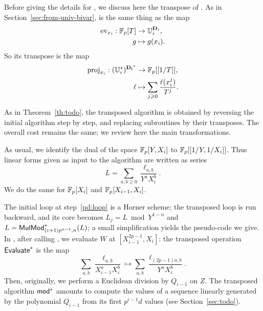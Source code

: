 Before giving the details for , we discuss here the
transpose of .  As in
Section~\ref{sec:from-univ-bivar},  is the same thing
as the map
\begin{equation}
  \label{eq:81}
  \begin{aligned}
    \operatorname{ev}_{x_i}:\mathbb{F}_p[T] &\rightarrow \mathbb{U}_i^{\mathbf{D}_i}\text{,}\\ 
    g&\mapsto g(x_i)\text{.}
  \end{aligned}
\end{equation}
So its transpose is the map
\begin{equation}
  \label{eq:82}
  \begin{aligned}
    \operatorname{proj}_{x_i}:(\mathbb{U}_i^\ast)^{\mathbf{D_i}^\ast}&\rightarrow\mathbb{F}_p[[1/T]]\text{,}\\
    \ell&\mapsto\sum_{j\geqslant0}\frac{\ell(x_i^j)}{T^j}\text{.}
  \end{aligned}
\end{equation}

As in Theorem~\ref{th:todo}, the transposed algorithm is obtained by
reversing the initial algorithm step by step, and replacing
subroutines by their transposes. The overall cost remains the same; we
review here the main transformations.

As usual, we identify the dual of the space $\mathbb{F}_p[Y,X_i]$ to
$\mathbb{F}_p[[1/Y,1/X_i]]$. Thus linear forms given as input to the algorithm
are written as series
\begin{equation}
  \label{eq:84}
  L=\sum_{a,b\ge0}\frac{\ell_{a,b}}{Y^aX_i^b}
  \text{.}
\end{equation}
We do the same for $\mathbb{F}_p[X_i]$ and $\mathbb{F}_p[X_{i-1},X_i]$.

The initial loop at step~\ref{pd:loop} is a Horner scheme; the
transposed loop is run backward, and its core becomes $L_j=L\bmod
Y^{1-n}$ and $L={\sf MulMod}_{(c+1)p^{n-1},n}^\ast(L)$; a small
simplification yields the pseudo-code we give.  In ,
after calling , we evaluate $W$ at
$[X_{i-1}^{2p-1},X_i]$: the transposed operation ${\sf
    Evaluate}^\ast$ is the map
\begin{equation}
  \label{eq:83}
  \sum_{a,b} \frac{\ell_{a,b}}{X_{i-1}^a X_i^b} \mapsto
  \sum_{a,b} \frac{\ell_{(2p-1)a,b}}{Y^a X_i^b}
  \text{.} 
\end{equation}
Then, originally, we perform a Euclidean division by $Q_{i-1}$ on
$Z$. The transposed algorithm $\sf mod^\ast$ amounts to compute the
values of a sequence linearly generated by the polynomial $Q_{i-1}$
from its first $p^{i-1}d$ values (see
Section~\ref{sec:todo}). 

